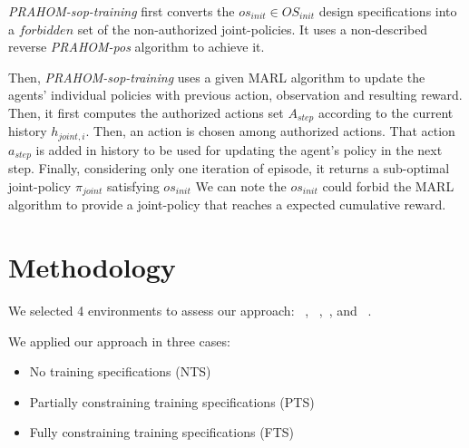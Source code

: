 \documentclass{ecai}
\begin{document}
\emph{PRAHOM-sop-training} first converts the $os_{init} \in OS_{init}$ design specifications into a $forbidden$ set of the non-authorized joint-policies. It uses a non-described reverse \emph{PRAHOM-pos} algorithm to achieve it.

Then, \emph{PRAHOM-sop-training} uses a given MARL algorithm to update the agents' individual policies with previous action, observation and resulting reward. Then, it first computes the authorized actions set $A_{step}$ according to the current history $h_{joint,i}$. Then, an action is chosen among authorized actions. That action $a_{step}$ is added in history to be used for updating the agent's policy in the next step.
Finally, considering only one iteration of episode, it returns a sub-optimal joint-policy $\pi_{joint}$ satisfying $os_{init}$
We can note the $os_{init}$ could forbid the MARL algorithm to provide a joint-policy that reaches a expected cumulative reward.


\section{Methodology}


We selected 4 environments to assess our approach: ~\citep{Lowe2017},
~\citep{Kurach2020},~\citep{Terry2021}, and ~\citep{Terry2021}.


We applied our approach in three cases:
\begin{itemize}
    \item No training specifications (NTS)
    \item Partially constraining training specifications (PTS)
    \item Fully constraining training specifications (FTS)
\end{itemize}
\end{document}
